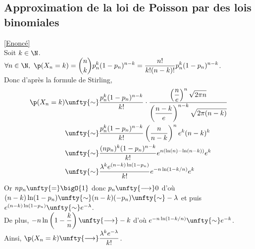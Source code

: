 \documentclass[8pt]{book}
\begin{document}
	\subsection{Approximation de la loi de Poisson par des lois binomiales }
	\label{Approximation de la loi de Poisson par des lois binomiales corrigé}
		\textcolor{blue}{\hyperref[Approximation d'une loi de Poisson par des lois binomiales]{[Enoncé]}}\\
	Soit $k\in \N$.\\
	$\forall n\in \N,\ \p(X_n=k)=\displaystyle\binom{n}{k}p_n^k(1-p_n)^{n-k}=\frac{n!}{k!(n-k)!}p_n^k(1-p_n)^{n-k}$.\\
	Donc d'après la formule de Stirling,
	\begin{align*}
		\p(X_n=k)&\unfty{\sim}\displaystyle\frac{p_n^k(1-p_n)^{n-k}}{k!}\cdot\frac{\left(\displaystyle\frac{n}{e}\right)^n\displaystyle\sqrt{2\pi n}}{\left(\displaystyle\frac{n-k}{e}\right)^{n-k}\displaystyle\sqrt{2\pi(n-k)}}\\
		&\unfty{\sim}\displaystyle\frac{p_n^k(1-p_n)^{n-k}}{k!}\left(\frac{n}{n-k}\right)^ne^k(n-k)^k\\
		&\unfty{\sim}\displaystyle\frac{(np_n)^k(1-p_n)^{n-k}}{k!}e^{n(\ln(n)-\ln(n-k))}e^k\\
		&\unfty{\sim}\displaystyle\frac{\lambda^ke^{(n-k)\ln(1-p_n)}}{k!}e^{-n\ln(1-k/n)}e^k
	\end{align*}
	Or $np_n\unfty{=}\bigO{1}$ donc $p_n\unfty{\longrightarrow}0$ d'où $(n-k)\ln(1-p_n)\unfty{\sim}(n-k)(-p_n)\unfty{\sim}-\lambda$ et puis $e^{(n-k)\ln(1-p_n)}\unfty{\sim}e^{-\lambda}$.\\
	De plus, $-n\ln\left(1-\displaystyle\frac{k}{n}\right)\unfty{\longrightarrow}-k$ d'où $e^{-n\ln(1-k/n)}\unfty{\sim}e^{-k}$.\\
	Ainsi, $\p(X_n=k)\unfty{\longrightarrow}\displaystyle\frac{\lambda^ke^{-\lambda}}{k!}$.
	
\end{document}
